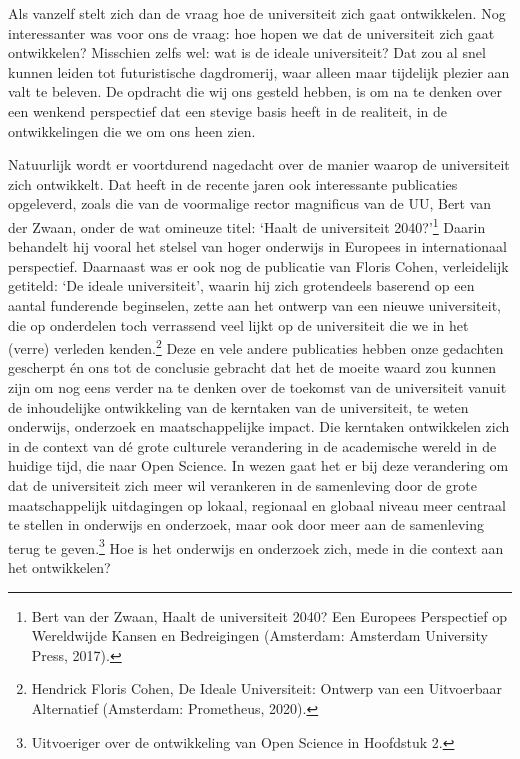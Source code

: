 \documentclass{jote-book}
\begin{document}
	Als vanzelf stelt zich dan de vraag hoe de universiteit zich gaat ontwikkelen. Nog interessanter was voor ons de vraag: hoe hopen we dat de universiteit zich gaat ontwikkelen? Misschien zelfs wel: wat is de ideale universiteit? Dat zou al snel kunnen leiden tot futuristische dagdromerij, waar alleen maar tijdelijk plezier aan valt te beleven. De opdracht die wij ons gesteld hebben, is om na te denken over een wenkend perspectief dat een stevige basis heeft in de realiteit, in de ontwikkelingen die we om ons heen zien.







	Natuurlijk wordt er voortdurend nagedacht over de manier waarop de universiteit zich ontwikkelt. Dat heeft in de recente jaren ook interessante publicaties opgeleverd, zoals die van de voormalige rector magnificus van de UU, Bert van der Zwaan, onder de wat omineuze titel: ‘Haalt de universiteit 2040?'\footnote{Bert van der Zwaan, Haalt de universiteit 2040? Een Europees Perspectief op Wereldwijde Kansen en Bedreigingen (Amsterdam: Amsterdam University Press, 2017). } Daarin behandelt hij vooral het stelsel van hoger onderwijs in Europees in internationaal perspectief. Daarnaast was er ook nog de publicatie van Floris Cohen, verleidelijk getiteld: ‘De ideale universiteit', waarin hij zich grotendeels baserend op een aantal funderende beginselen, zette aan het ontwerp van een nieuwe universiteit, die op onderdelen toch verrassend veel lijkt op de universiteit die we in het (verre) verleden kenden.\footnote{Hendrick Floris Cohen, De Ideale Universiteit: Ontwerp van een Uitvoerbaar Alternatief (Amsterdam: Prometheus, 2020).} Deze en vele andere publicaties hebben onze gedachten gescherpt én ons tot de conclusie gebracht dat het de moeite waard zou kunnen zijn om nog eens verder na te denken over de toekomst van de universiteit vanuit de inhoudelijke ontwikkeling van de kerntaken van de universiteit, te weten onderwijs, onderzoek en maatschappelijke impact. Die kerntaken ontwikkelen zich in de context van dé grote culturele verandering in de academische wereld in de huidige tijd, die naar Open Science. In wezen gaat het er bij deze verandering om dat de universiteit zich meer wil verankeren in de samenleving door de grote maatschappelijk uitdagingen op lokaal, regionaal en globaal niveau meer centraal te stellen in onderwijs en onderzoek, maar ook door meer aan de samenleving terug te geven.\footnote{Uitvoeriger over de ontwikkeling van Open Science in Hoofdstuk 2.} Hoe is het onderwijs en onderzoek zich, mede in die context aan het ontwikkelen?
\end{document}
